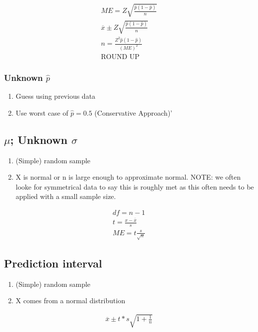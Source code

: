 \begin{align}
  ME = Z\sqrt{\frac{\hat{p}(1-\hat{p})}{n}} \\
  \overbar{x} \pm Z\sqrt{\frac{\hat{p}(1-\hat{p})}{n}} \\
  n = \frac{Z^2\hat{p}(1 - \hat{p})}{(ME)^2} \\
  \text{ROUND UP}
\end{align}

\subsubsection{Unknown $\hat{p}$}
\begin{enumerate}
\item Guess using previous data
\item Use worst case of $\hat{p} = 0.5$ (Conservative Approach)'
\end{enumerate}

\subsection{$\mu$; Unknown $\sigma$}
\begin{enumerate}
\item (Simple) random sample
\item X is normal or n is large enough to approximate normal. NOTE: we often looke for symmetrical data to say this is roughly met as this often needs to be applied with a small sample size.
\end{enumerate}

\begin{align}
  df = n - 1 \\
  t = \frac{x - \overbar{x}}{s} \\
  ME = t\frac{s}{\sqrt{n}}
\end{align}

\subsection{Prediction interval}
\begin{enumerate}
\item (Simple) random sample
\item X comes from a normal distribution
\end{enumerate}

\begin{align}
  \overbar{x} \pm t * s\sqrt{1 + \frac{1}{n}}
\end{align}

